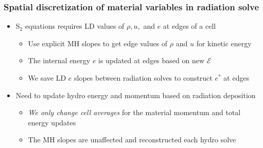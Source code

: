 \documentclass[xcolor=dvipsnames,fontsize=8pt]{beamer}
\newcommand{\E}{\mathcal{E}}
\newlength{\wideitemsep}
\let\olditem\item
\renewcommand{\item}{\setlength{\itemsep}{\wideitemsep}\olditem}
\begin{document}
\begin{frame}
    \frametitle{Spatial discretization of material variables in radiation solve}
    \begin{itemize}
        \item S$_2$ equations requires LD values of $\rho,u,$ and $e$ at edges of a cell
        \begin{itemize}
            \item Use explicit MH slopes to get edge values of $\rho$ and $u$ for kinetic
                energy
            \item The internal energy $e$ is updated at edges based on new $\E$
             \item We save LD $e$ slopes between radiation solves to construct
                 $e^*$ at edges
        \end{itemize}
        \item Need to update hydro energy and momentum based on radiation
            deposition
            \begin{itemize}
    \item \emph{We only change cell
        averages} for the material momentum and total energy updates
    \item The MH slopes are unaffected and reconstructed each hydro solve
\end{itemize}
    \end{itemize}

\end{frame}
\end{document}
